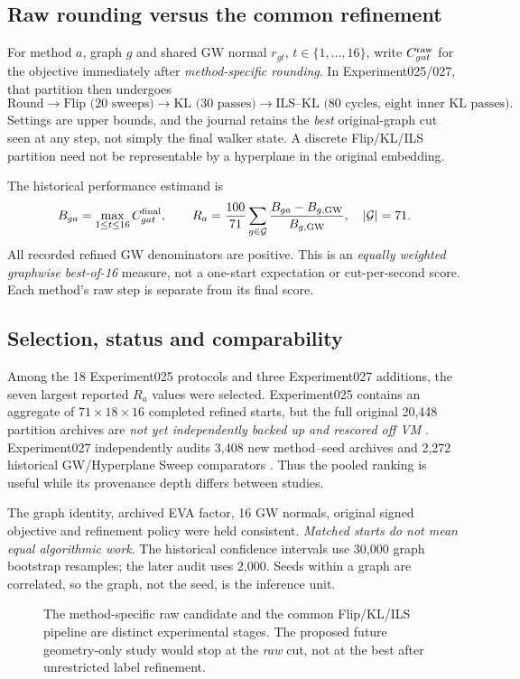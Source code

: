 \subsection{Raw rounding versus the common refinement}
For method $a$, graph $g$ and shared GW normal $r_{gt}$,
$t\in\{1,\ldots,16\}$, write $C^{\rm raw}_{gat}$ for
the objective immediately after \emph{method-specific rounding}.
In Experiment025/027, that partition then undergoes
\[
\boxed{\text{Round}\longrightarrow
\text{Flip (20 sweeps)}\longrightarrow
\text{KL (30 passes)}\longrightarrow
\text{ILS--KL (80 cycles, eight inner KL passes)}.}
\]
Settings are upper bounds, and the journal retains the
\emph{best} original-graph cut seen at any step, not simply
the final walker state. A discrete Flip/KL/ILS partition
need not be representable by a hyperplane in the original embedding.

The historical performance estimand is
\begin{equation}\label{eq:metric}
B_{ga}=\max_{1\le t\le16}C^{\rm final}_{gat},\qquad
R_a=\frac{100}{71}\sum_{g\in\mathcal G}
\frac{B_{ga}-B_{g,\mathrm{GW}}}{B_{g,\mathrm{GW}}},
\quad|\mathcal G|=71.
\end{equation}
All recorded refined GW denominators are positive.
This is an \emph{equally weighted graphwise best-of-16}
measure, not a one-start expectation or cut-per-second score.
Each method's raw step is separate from its final score.

\subsection{Selection, status and comparability}
Among the 18 Experiment025 protocols and three Experiment027
additions, the seven largest reported $R_a$ values were selected.
Experiment025 contains an aggregate of $71\times18\times16$
completed refined starts, but the full original 20,448
partition archives are \emph{not yet independently backed up
and rescored off VM} \citep{experiment025}. Experiment027
independently audits 3,408 new method--seed archives and
2,272 historical GW/Hyperplane Sweep comparators \citep{experiment027}.
Thus the pooled ranking is useful while its provenance depth
differs between studies.

The graph identity, archived EVA factor, 16 GW normals,
original signed objective and refinement policy were held
consistent. \emph{Matched starts do not mean equal algorithmic work}.
The historical confidence intervals use 30,000 graph bootstrap
resamples; the later audit uses 2,000. Seeds within a graph are
correlated, so the graph, not the seed, is the inference unit.

\begin{figure}[tb]
\centering

\caption{The method-specific raw candidate and the common Flip/KL/ILS
pipeline are distinct experimental stages. The proposed future
geometry-only study would stop at the \emph{raw} cut, not at
the best after unrestricted label refinement.}
\label{fig:pipeline}
\end{figure}
